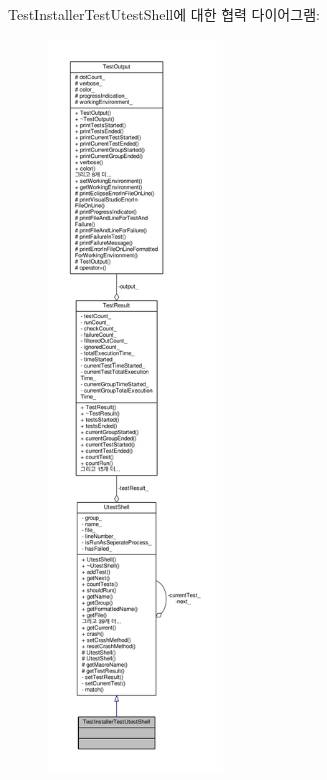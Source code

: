 Test\+Installer\+Test\+Utest\+Shell에 대한 협력 다이어그램\+:
\nopagebreak
\begin{figure}[H]
\begin{center}
\leavevmode
\includegraphics[height=550pt]{class_test_installer_test_utest_shell__coll__graph}
\end{center}
\end{figure}

